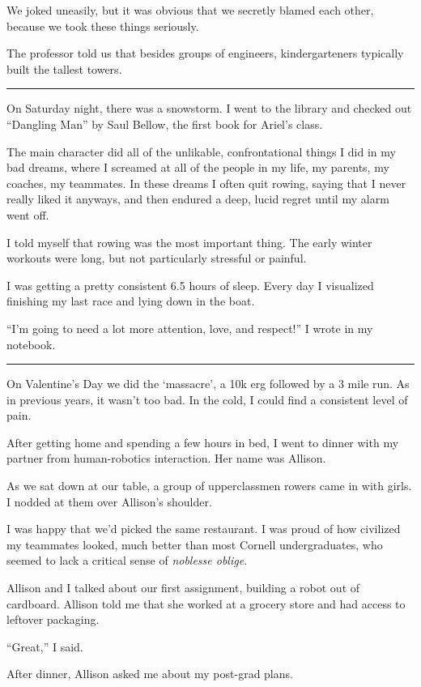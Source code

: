 We joked uneasily, but it was obvious that we secretly blamed each other,
because we took these things seriously.

The professor told us that besides groups of engineers, kindergarteners
typically built the tallest towers.

\plainfancybreak{12pt}{2}{}

On Saturday night, there was a snowstorm.  I went to the library and checked out
``Dangling Man'' by Saul Bellow, the first book for Ariel's class.

The main character did all of the unlikable, confrontational things I did in my
bad dreams, where I screamed at all of the people in my life, my parents, my
coaches, my teammates.  In these dreams I often quit rowing, saying that I never
really liked it anyways, and then endured a deep, lucid regret until my alarm
went off.

I told myself that rowing was the most important thing.  The early winter
workouts were long, but not particularly stressful or painful.  

I was getting a pretty consistent 6.5 hours of sleep.  Every day I visualized
finishing my last race and lying down in the boat.  

``I'm going to need a lot more attention, love, and respect!'' I wrote in my
notebook. 

\plainfancybreak{12pt}{2}{}

On Valentine's Day we did the `massacre', a 10k erg followed by a 3 mile run.
As in previous years, it wasn't too bad.  In the cold, I could find a consistent
level of pain.

After getting home and spending a few hours in bed, I went to dinner with my
partner from human-robotics interaction.  Her name was Allison. 

As we sat down at our table, a group of upperclassmen rowers came in with girls.
I nodded at them over Allison's shoulder.  

I was happy that we'd picked the same restaurant.  I was proud of how civilized
my teammates looked, much better than most Cornell undergraduates, who seemed to
lack a critical sense of \textit{noblesse oblige}.

Allison and I talked about our first assignment, building a robot out of
cardboard.  Allison told me that she worked at a grocery store and had access to
leftover packaging.

``Great,'' I said.

After dinner, Allison asked me about my post-grad plans.  


